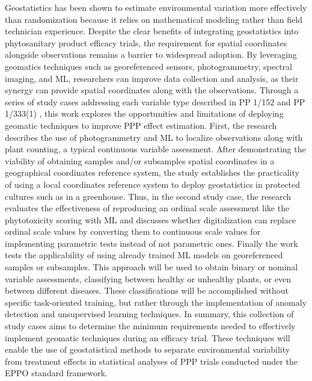 \documentclass[12pt,a4paper,oneside]{report}
\begin{document}
Geostatistics has been shown to estimate environmental variation more effectively 
than randomization because it relies on mathematical modeling rather than field 
technician experience.
Despite the clear benefits of integrating geostatistics into phytosanitary
product efficacy trials, the requirement for spatial coordinates alongside 
observations remains a barrier to widespread adoption.
By leveraging geomatics techniques such as georeferenced sensors, photogrammetry,
spectral imaging, and ML, researchers can improve data collection and 
analysis, as their synergy can provide spatial coordinates
along with the observations.
Through a series of study cases addressing each variable type described in 
PP 1/152 \cite{EPPO_PP1_152} and 
PP 1/333(1) \cite{PP1333}, 
this work explores the opportunities and limitations of deploying geomatic techniques 
to improve PPP effect estimation.
First, the research describes the use of photogrammetry and ML to localize observations
along with plant counting, a typical continuous variable assessment. 
After demonstrating the viability of obtaining samples and/or subsamples spatial coordinates in a
geographical coordinates reference system, the study establishes the practicality of using a local 
coordinates reference system to deploy geostatistics in protected cultures such as in 
a greenhouse. Thus, in the second study case, the research evaluates the effectiveness of 
reproducing an ordinal scale assessment like the phytotoxicity scoring with 
ML and discusses whether digitalization can replace ordinal scale values by 
converting them to continuous scale values for implementing parametric tests instead 
of not parametric
ones. Finally the work tests the applicability of using already trained ML models 
on georeferenced samples or subsamples. This approach will be used to
obtain binary or nominal variable assessments, classifying between healthy or unhealthy
plants, or even between different diseases. These classifications will be accomplished 
without specific task-oriented training, but rather through the implementation of 
anomaly detection and unsupervised learning techniques.
In summary, this collection of study cases aims to determine the minimum requirements 
needed to effectively implement geomatic techniques during an efficacy trial. 
These techniques will enable 
the use of geostatistical methods to separate environmental variability from treatment 
effects in statistical analyses of PPP trials conducted under 
the EPPO standard framework.



\end{document}
